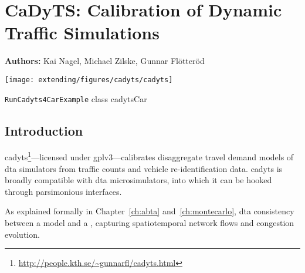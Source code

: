 \chapter{CaDyTS: Calibration of Dynamic Traffic Simulations}
\label{ch:cadyts}
%

\hfill \textbf{Authors:} Kai Nagel, Michael Zilske, Gunnar Fl\"otter\"od

\begin{center} \texttt{[image: extending/figures/cadyts/cadyts]} \end{center}


{\lstinline{RunCadyts4CarExample} class}
{cadytsCar}
{\citet[][]{cadyts-manual, floetteroed-2010e, FloetteroedChenEtAl2011BehavioralCalibAndAnaNETS, Floetteroed2008PhD, Moyo2013PhD}}



\section{Introduction}

\gls{cadyts}\footnote{\url{http://people.kth.se/~gunnarfl/cadyts.html}}---licensed under \gls{gplv3}---calibrates disaggregate travel demand models 
of \gls{dta} simulators from traffic counts and vehicle re-identification data. 
\gls{cadyts} is broadly compatible with \gls{dta} microsimulators,
into which it can be hooked through 
parsimonious interfaces.

As explained formally in Chapter~\ref{ch:abta} and~\ref{ch:montecarlo},
\gls{dta}  consistency between a  model and a
, capturing
spatiotemporal network flows and congestion evolution.

